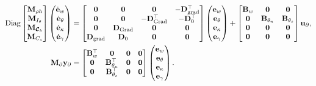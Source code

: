 \begin{equation}
\begin{aligned}
\mathrm{Diag}\begin{bmatrix}
\mathbf{M}_{\rho h}\\
\mathbf{M}_{I_\theta}\\
\mathbf{M}_{\bm{\mathcal{C}}_b}\\
\mathbf{M}_{{C}_s} \\
\end{bmatrix}
\begin{pmatrix}
\dot{\mathbf{e}}_{w} \\
\dot{\mathbf{e}}_{\theta} \\
\dot{\mathbf{e}}_{\kappa} \\
\dot{\mathbf{e}}_{\gamma} \\
\end{pmatrix}
&= \begin{bmatrix}
\mathbf{0} & \mathbf{0} & \mathbf{0} & -\mathbf{D}_{\operatorname*{grad}}^\top \\
\mathbf{0} & \mathbf{0} & -\mathbf{D}_{\operatorname*{Grad}}^\top & -\mathbf{D}_{0}^\top \\
\mathbf{0} & \mathbf{D}_{\operatorname*{Grad}} & \mathbf{0} & \mathbf{0}\\
\mathbf{D}_{\operatorname*{grad}} & \mathbf{D}_{0} & \mathbf{0} & \mathbf{0}\\
\end{bmatrix} 
\begin{pmatrix}
{\mathbf{e}}_{w} \\
{\mathbf{e}}_{\theta} \\
{\mathbf{e}}_{\kappa} \\
{\mathbf{e}}_{\gamma} \\
\end{pmatrix} + 
\begin{bmatrix}
\mathbf{B}_w & \mathbf{0} & \mathbf{0} \\
\mathbf{0} & \mathbf{B}_{\theta_n} & \mathbf{B}_{\theta_s}\\
\mathbf{0} & \mathbf{0} & \mathbf{0} \\
\mathbf{0} & \mathbf{0} & \mathbf{0} \\
\end{bmatrix}
\mathbf{u}_\partial, \\
\mathbf{M}_\partial {\mathbf{y}_\partial} &= \begin{bmatrix}
\mathbf{B}_w^\top & \mathbf{0} & \mathbf{0} & \mathbf{0} \\
\mathbf{0} & \mathbf{B}_{\theta_n}^\top & \mathbf{0} & \mathbf{0}\\ 
\mathbf{0} & \mathbf{B}_{\theta_s}^\top & \mathbf{0} & \mathbf{0}\\
\end{bmatrix}
\begin{pmatrix}
{\mathbf{e}}_{w} \\
{\mathbf{e}}_{\theta} \\
{\mathbf{e}}_{\kappa} \\
{\mathbf{e}}_{\gamma} \\
\end{pmatrix}.
\end{aligned}
\end{equation}
